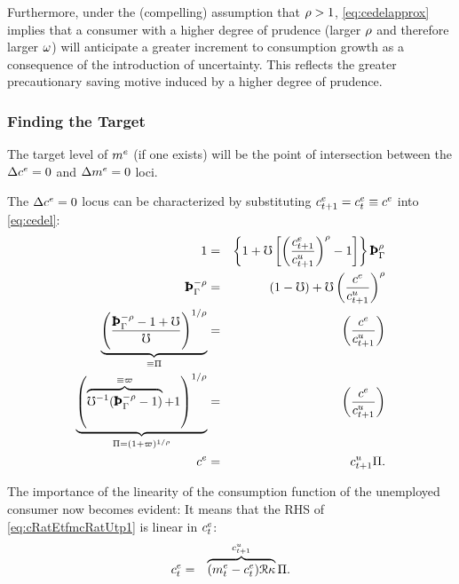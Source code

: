 \documentclass{handout}
\begin{document}
Furthermore, under the (compelling) assumption that $\rho > 1$, \eqref{eq:cedelapprox} implies that a consumer with
a higher degree of prudence (larger $\rho$ and therefore larger $\omega$) will
anticipate a greater increment to consumption growth as a consequence of the introduction of uncertainty.  This reflects the greater precautionary
saving motive induced by a higher degree of prudence.



\subsubsection{Finding the Target}

The target level of $m^{e}$ (if one exists) will be the point of intersection between the $\Delta c^{e}=0$ and $\Delta m^{e}=0$ loci.  

The $\Delta c^{e}=0$ locus can be characterized by substituting $c^{e}_{t+1}=c^{e}_{t} \equiv c^{e}$ into \eqref{eq:cedel}:
\begin{eqnarray}
         1 & = & \left\{1+\urate\left[\left(\frac{\cRatE_{t+1}}{\cRat_{t+1}^{u}}\right)^{\CRRA}-1\right]\right\} \PatPGro^{\CRRA} \label{eq:ctp1OctEq1}
\\ \PatPGro^{-\CRRA} & = &  (1-\urate)+\urate\left(\frac{\cRatE_{\tSS}}{\cRat_{t+1}^{u} }\right)^{\CRRA}
\\ \underbrace{\left(\frac{\PatPGro^{-\CRRA}-1+\urate}{\urate}\right)^{1/\CRRA}}_{\equiv \straight} & = &   \left(\frac{\cRatE_{\tSS}}{\cRatU_{t+1}}\right) \label{eq:straightDef}
\\ \underbrace{\left(\overbrace{\urate^{-1}(\PatPGro^{-\CRRA}-1)}^{\equiv \varpi}+1\right)^{1/\CRRA}}_{\straight=(1+\varpi)^{1/\CRRA}} & = &   \left(\frac{\cRatE_{\tSS}}{\cRatU_{t+1}}\right) \label{eq:varpiDef}
\\      \cRatE_{\tSS} & = & \cRat^{u}_{t+1} \straight \label{eq:cRatEtfmcRatUtp1}.
\end{eqnarray}


The importance of the linearity of the consumption function of the unemployed consumer now becomes evident:  It means that the RHS of \eqref{eq:cRatEtfmcRatUtp1} is linear in $c^{e}_{t}$:
\begin{eqnarray}
  c^{e}_{t} & = & \overbrace{(m^{e}_{t}-c^{e}_{t})\mathcal{R} \kappa}^{c^{u}_{t+1}} \Pi \label{eq:PSTerm}.
\end{eqnarray}
\end{document}

